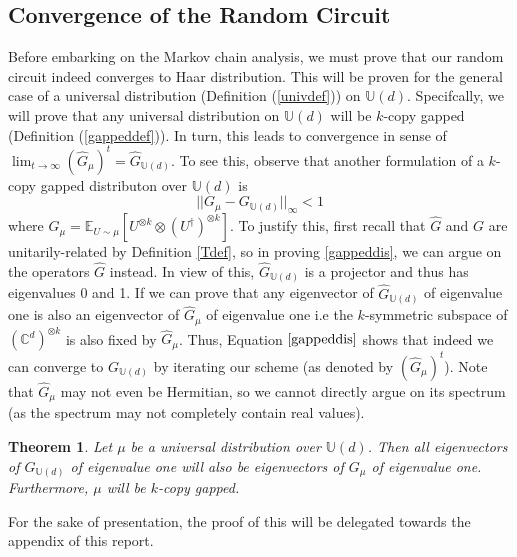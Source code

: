 \documentclass[12pt]{amsart}
\newtheorem{theorem}{Theorem}[section]
\theoremstyle{definition}
\theoremstyle{remark}
\numberwithin{equation}{section}
\theoremstyle{remark}
\begin{document}
\subsection{Convergence of the Random Circuit}
Before embarking on the Markov chain analysis, we must prove that our random circuit indeed converges to Haar distribution. This will be proven for the general case of a universal distribution (Definition (\ref{univdef})) on $\mathbb{U}(d)$. Specifcally, we will prove that any universal distribution on $\mathbb{U}(d)$ will be $k$-copy gapped (Definition (\ref{gappeddef})). In turn, this leads to convergence in sense of $\lim_{t \rightarrow \infty} (\widehat{G}_{\mu})^{t} = \widehat{G}_{\mathbb{U}(d)}$. To see this, observe that another formulation of a $k$-copy gapped distributon over $\mathbb{U}(d)$ is
\begin{equation} \label{gappeddis}
  ||G_{\mu} - G_{\mathbb{U}(d)}||_\infty < 1
\end{equation}
where $G_{\mu} = \mathbb{E}_{U \sim \mu} \left[ U^{\otimes k} \otimes (U^\dagger)^{\otimes k} \right]$. To justify this, first recall that $\widehat{G}$ and $G$ are unitarily-related by Definition \ref{Tdef}, so in proving \ref{gappeddis}, we can argue on the operators $\widehat{G}$ instead. In view of this, $\widehat{G}_{\mathbb{U}(d)}$ is a projector and thus has eigenvalues 0 and 1. If we can prove that any eigenvector of $\widehat{G}_{\mathbb{U}(d)}$ of eigenvalue one is also an eigenvector of $\widehat{G}_{\mu}$ of eigenvalue one i.e the $k$-symmetric subspace of $(\mathbb{C}^d)^{\otimes k}$ is also fixed by $\widehat{G}_{\mu}$. Thus, Equation $\ref{gappeddis}$ shows that indeed we can converge to $G_{\mathbb{U}(d)}$ by iterating our scheme (as denoted by $(\widehat{G}_\mu)^t$). Note that $\widehat{G}_{\mu}$ may not even be Hermitian, so we cannot directly argue on its spectrum (as the spectrum may not completely contain real values).
%
\begin{theorem} \label{convergence}
  Let $\mu$ be a universal distribution over $\mathbb{U}(d)$. Then all eigenvectors of $G_{\mathbb{U}(d)}$ of eigenvalue one will also be eigenvectors of $G_{\mu}$ of eigenvalue one. Furthermore, $\mu$ will be $k$-copy gapped.
\end{theorem}
%
\noindent For the sake of presentation, the proof of this will be delegated towards the appendix of this report.
%
\end{document}
